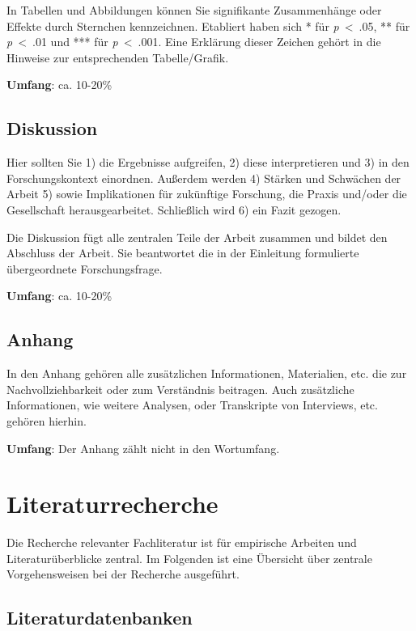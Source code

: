 \documentclass[
  letterpaper,
  DIV=11]{scrreprt}
\begin{document}
In Tabellen und Abbildungen können Sie signifikante Zusammenhänge oder
Effekte durch Sternchen kennzeichnen. Etabliert haben sich * für
\emph{p}~\textless~.05, ** für \emph{p}~\textless~.01 und *** für
\emph{p}~\textless~.001. Eine Erklärung dieser Zeichen gehört in die
Hinweise zur entsprechenden Tabelle/Grafik.

\textbf{Umfang}: ca. 10-20\%

\section{Diskussion}\label{diskussion}

Hier sollten Sie 1) die Ergebnisse aufgreifen, 2) diese interpretieren
und 3) in den Forschungskontext einordnen. Außerdem werden 4) Stärken
und Schwächen der Arbeit 5) sowie Implikationen für zukünftige
Forschung, die Praxis und/oder die Gesellschaft herausgearbeitet.
Schließlich wird 6) ein Fazit gezogen.

Die Diskussion fügt alle zentralen Teile der Arbeit zusammen und bildet
den Abschluss der Arbeit. Sie beantwortet die in der Einleitung
formulierte übergeordnete Forschungsfrage.

\textbf{Umfang}: ca. 10-20\%

\section{Anhang}\label{anhang}

In den Anhang gehören alle zusätzlichen Informationen, Materialien, etc.
die zur Nachvollziehbarkeit oder zum Verständnis beitragen. Auch
zusätzliche Informationen, wie weitere Analysen, oder Transkripte von
Interviews, etc. gehören hierhin.

\textbf{Umfang}: Der Anhang zählt nicht in den Wortumfang.

\chapter{Literaturrecherche}\label{literaturrecherche}

Die Recherche relevanter Fachliteratur ist für empirische Arbeiten und
Literaturüberblicke zentral. Im Folgenden ist eine Übersicht über
zentrale Vorgehensweisen bei der Recherche ausgeführt.

\section{Literaturdatenbanken}\label{literaturdatenbanken}
\end{document}
